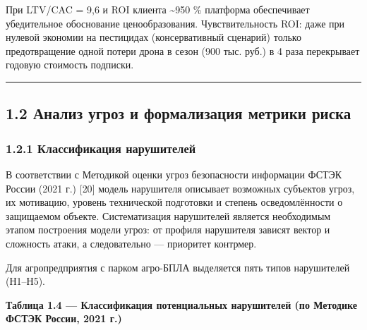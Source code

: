 При LTV/CAC = 9,6 и ROI клиента \textasciitilde950 \% платформа обеспечивает убедительное обоснование ценообразования. Чувствительность ROI: даже при нулевой экономии на пестицидах (консервативный сценарий) только предотвращение одной потери дрона в сезон (900 тыс. руб.) в 4 раза перекрывает годовую стоимость подписки.

\begin{center}\rule{0.5\linewidth}{0.5pt}\end{center}

\hypertarget{ux430ux43dux430ux43bux438ux437-ux443ux433ux440ux43eux437-ux438-ux444ux43eux440ux43cux430ux43bux438ux437ux430ux446ux438ux44f-ux43cux435ux442ux440ux438ux43aux438-ux440ux438ux441ux43aux430}{%
\subsection{1.2 Анализ угроз и формализация метрики риска}\label{ux430ux43dux430ux43bux438ux437-ux443ux433ux440ux43eux437-ux438-ux444ux43eux440ux43cux430ux43bux438ux437ux430ux446ux438ux44f-ux43cux435ux442ux440ux438ux43aux438-ux440ux438ux441ux43aux430}}

\hypertarget{ux43aux43bux430ux441ux441ux438ux444ux438ux43aux430ux446ux438ux44f-ux43dux430ux440ux443ux448ux438ux442ux435ux43bux435ux439}{%
\subsubsection{1.2.1 Классификация нарушителей}\label{ux43aux43bux430ux441ux441ux438ux444ux438ux43aux430ux446ux438ux44f-ux43dux430ux440ux443ux448ux438ux442ux435ux43bux435ux439}}

В соответствии с Методикой оценки угроз безопасности информации ФСТЭК России (2021 г.) {[}20{]} модель нарушителя описывает возможных субъектов угроз, их мотивацию, уровень технической подготовки и степень осведомлённости о защищаемом объекте. Систематизация нарушителей является необходимым этапом построения модели угроз: от профиля нарушителя зависят вектор и сложность атаки, а следовательно --- приоритет контрмер.

Для агропредприятия с парком агро-БПЛА выделяется пять типов нарушителей (Н1--Н5).

\textbf{Таблица 1.4 --- Классификация потенциальных нарушителей (по Методике ФСТЭК России, 2021 г.)}

